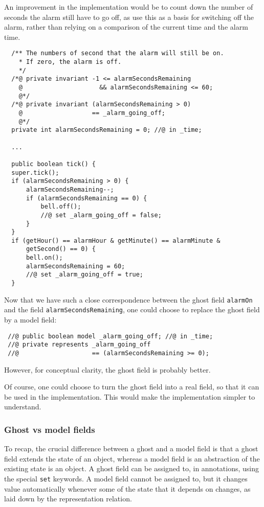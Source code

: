 \documentclass{llncs}
\begin{document}

An improvement in the implementation would be to count down the number of 
seconds the alarm still have to go off, as use this as a basis for switching 
off the alarm, rather than relying on a comparison of the current time 
and the alarm time.

\begin{verbatim}
  /** The numbers of second that the alarm will still be on.
    * If zero, the alarm is off.
    */
  /*@ private invariant -1 <= alarmSecondsRemaining 
    @                     && alarmSecondsRemaining <= 60;
    @*/
  /*@ private invariant (alarmSecondsRemaining > 0)
    @                   == _alarm_going_off;
    @*/
  private int alarmSecondsRemaining = 0; //@ in _time;

  ...

  public boolean tick() {
  super.tick();
  if (alarmSecondsRemaining > 0) {
      alarmSecondsRemaining--;
      if (alarmSecondsRemaining == 0) {
          bell.off();
          //@ set _alarm_going_off = false;
      }
  }
  if (getHour() == alarmHour & getMinute() == alarmMinute &
      getSecond() == 0) {
      bell.on();
      alarmSecondsRemaining = 60;
      //@ set _alarm_going_off = true;
  }
\end{verbatim}
Now that we have such a close correspondence between the
ghost field \texttt{alarmOn} and the field
\texttt{alarmSecondsRemaining}, one could choose to replace
the ghost field by a model field:
\begin{verbatim}
 //@ public boolean model _alarm_going_off; //@ in _time;
 //@ private represents _alarm_going_off 
 //@                    == (alarmSecondsRemaining >= 0);
\end{verbatim}
However, for conceptual clarity, the ghost field is probably better.

Of course, one could choose to turn the ghost field into a real field,
so that it can be used in the implementation.
This would make the implementation simpler to understand.

\subsubsection*{Ghost vs model fields}

To recap, the crucial difference between a ghost and a model field 
is that a ghost field extends the state of an object, whereas
a model field is an abstraction of the existing state is an object.
A ghost field can be assigned to, in annotations, using the
special \texttt{set} keywords.
A model field cannot be assigned to, but it changes value automatically
whenever some of the state that it depends on changes, as laid down
by the representation relation.
\end{document}
